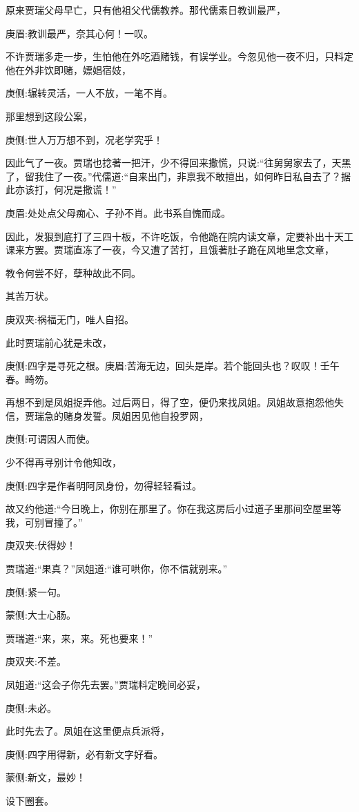 \begin{parag}
    原来贾瑞父母早亡，只有他祖父代儒教养。那代儒素日教训最严，\begin{note}庚眉:教训最严，奈其心何！一叹。\end{note}不许贾瑞多走一步，生怕他在外吃酒赌钱，有误学业。今忽见他一夜不归，只料定他在外非饮即赌，嫖娼宿妓，\begin{note}庚侧:辗转灵活，一人不放，一笔不肖。\end{note}那里想到这段公案，\begin{note}庚侧:世人万万想不到，况老学究乎！\end{note}因此气了一夜。贾瑞也捻著一把汗，少不得回来撒慌，只说:“往舅舅家去了，天黑了，留我住了一夜。”代儒道:“自来出门，非禀我不敢擅出，如何昨日私自去了？据此亦该打，何况是撒谎！”\begin{note}庚眉:处处点父母痴心、子孙不肖。此书系自愧而成。\end{note}因此，发狠到底打了三四十板，不许吃饭，令他跪在院内读文章，定要补出十天工课来方罢。贾瑞直冻了一夜，今又遭了苦打，且饿著肚子跪在风地里念文章，\begin{note}教令何尝不好，孽种故此不同。\end{note}其苦万状。\begin{note}庚双夹:祸福无门，唯人自招。\end{note}
\end{parag}


\begin{parag}
    此时贾瑞前心犹是未改，\begin{note}庚侧:四字是寻死之根。庚眉:苦海无边，回头是岸。若个能回头也？叹叹！壬午春。畸笏。\end{note}再想不到是凤姐捉弄他。过后两日，得了空，便仍来找凤姐。凤姐故意抱怨他失信，贾瑞急的赌身发誓。凤姐因见他自投罗网，\begin{note}庚侧:可谓因人而使。\end{note}少不得再寻别计令他知改，\begin{note}庚侧:四字是作者明阿凤身份，勿得轻轻看过。\end{note}故又约他道:“今日晚上，你别在那里了。你在我这房后小过道子里那间空屋里等我，可别冒撞了。”\begin{note}庚双夹:伏得妙！\end{note}贾瑞道:“果真？”凤姐道:“谁可哄你，你不信就别来。”\begin{note}庚侧:紧一句。\end{note}\begin{note}蒙侧:大士心肠。\end{note}贾瑞道:“来，来，来。死也要来！”\begin{note}庚双夹:不差。\end{note}凤姐道:“这会子你先去罢。”贾瑞料定晚间必妥，\begin{note}庚侧:未必。\end{note}此时先去了。凤姐在这里便点兵派将，\begin{note}庚侧:四字用得新，必有新文字好看。\end{note}\begin{note}蒙侧:新文，最妙！\end{note}设下圈套。
\end{parag}


